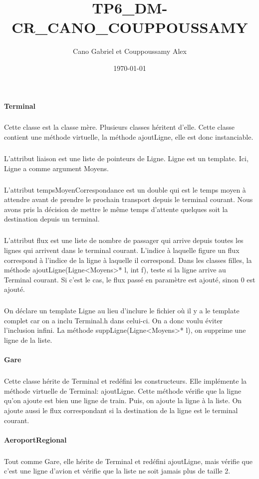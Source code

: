 \documentclass[a4paper]{article}
\title{TP6\_DM-CR\_CANO\_COUPPOUSSAMY}
\author{Cano Gabriel et Couppoussamy Alex}
\date{\today}
\begin{document}
\maketitle
	\begin{justify}
		\paragraph{Terminal}
		\subparagraph{}Cette classe est la classe mère. Plusieurs classes héritent d’elle. Cette classe contient une méthode virtuelle, la méthode ajoutLigne, elle est donc instanciable.\newline
		\subparagraph{}L’attribut liaison est une liste de pointeurs de Ligne. Ligne est un template. Ici, Ligne a comme argument Moyens. \newline
		\subparagraph{}L’attribut tempsMoyenCorrespondance est un double qui est le temps moyen à attendre avant de prendre le prochain transport depuis le terminal courant. Nous avons pris la décision de mettre le même temps d’attente quelques soit la destination depuis un terminal.\newline
		\subparagraph{}L’attribut flux est une liste de nombre de passager qui arrive depuis toutes les lignes qui arrivent dans le terminal courant. L’indice à laquelle figure un flux correspond à l’indice de la ligne à laquelle il correspond. Dans les classes filles, la méthode ajoutLigne(Ligne<Moyens>* l, int f), teste si la ligne arrive au Terminal courant. Si c’est le cas, le flux passé en paramètre est ajouté, sinon 0 est ajouté.\newline
		\subparagraph{}On déclare un template Ligne au lieu d’inclure le fichier où il y a le template complet car on a inclu Terminal.h dans celui-ci. On a donc voulu éviter l’inclusion infini.\newline
La méthode suppLigne(Ligne<Moyens>* l), on supprime une ligne de la liste.
		\paragraph{Gare}
		\subparagraph{}Cette classe hérite de Terminal et redéfini les constructeurs. Elle implémente la méthode virtuelle de Terminal: ajoutLigne. Cette méthode vérifie que la ligne qu’on ajoute est bien une ligne de train. Puis, on ajoute la ligne à la liste. On ajoute aussi le flux correspondant si la destination de la ligne est le terminal courant.
		\paragraph{AeroportRegional}
		\subparagraph{}Tout comme Gare, elle hérite de Terminal et redéfini ajoutLigne, mais vérifie que c’est une ligne d’avion et vérifie que la liste ne soit jamais plus de taille 2.

\end{justify}
\end{document}
